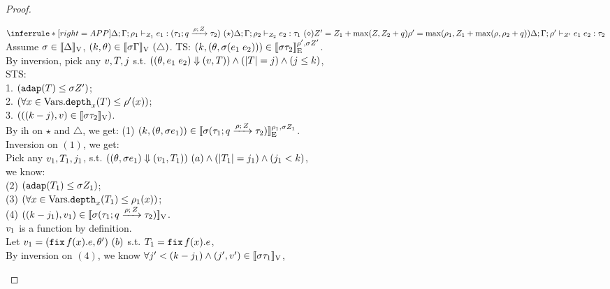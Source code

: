 \documentclass[a4paper,11pt]{article}
\theoremstyle{definition}
\begin{document}
\begin{proof}
\begin{mainitem}
\caseL
{
$
    \inferrule*[right = APP]
    {
      \Delta; \Gamma; \dmap_1 \tvdash{\nnatA_1} \expr_1: (\tarr{\type_1}{\type_2}{\nnatbiA}{\dmap}{\nnatA})~(\star) \\
      \Delta; \Gamma; \dmap_2 \tvdash{\nnatA_2} \expr_2: \type_1 ~(\diamond)\\\\
      \nnatA' = \nnatA_1 + \max(\nnatA, \nnatA_2 + \nnatbiA) \\
      \dmap' = \max(\dmap_1, \nnatA_1 + \max(\dmap, \dmap_2 + \nnatbiA))
    }{
      \Delta; \Gamma; \dmap' \tvdash{\nnatA'} \expr_1 \eapp \expr_2 : \type_2
    }
$
}
%
Assume $ \ienv \in \lrv{\Delta}$, $(\stepiA, \env) \in \lrv{\ienv \Gamma} ~ (\triangle)$. TS: $(\stepiA, (\env, \ienv  (\expr_1 \eapp \expr_2))) \in \lre{\dmap'}{\ienv \nnatA'}{\ienv \type_2}$.\\
%
By inversion, pick any $\valr, \tr, j$
%
s.t. $((\env, \expr_1 \eapp \expr_2) \bigstep (\valr, \tr)) 
\land (\size{\tr} = j) 
\land (j \leq \stepiA) $, \\
%
STS:\\
1. $(\adap(\tr) \leq \ienv \nnatA') $;\\
%
2. $ (\forall x \in \mbox{Vars}. \ddep{x}(\tr) \leq \dmap'(x))$;\\
%
3. $(((\stepiA - j), \valr) \in \lrv{\ienv \type_2})$.\\
%
By ih on $\star$ and $\triangle$, we get: (1) $(\stepiA, (\env, \ienv  \expr_1)) \in \lre{\dmap_1}{\ienv  \nnatA_1}{ \ienv (\tarr{\type_1}{\type_2}{\nnatbiA}{\dmap}{\nnatA}) }$.\\
%
Inversion on $(1)$, we get:\\
%
Pick any $\valr_1, \tr_1, j_1$, s.t. $((\env, \ienv \expr_1) \bigstep (\valr_1, \tr_1)) ~(a) \land (\size{\tr_1} = j_1) \land (j_1 < \stepiA)$, \\
%
we know: \\
(2) $(\adap(\tr_1) \leq \ienv \nnatA_1)$;\\
%
(3) $ (\forall x \in \mbox{Vars}. \ddep{x}(\tr_1) \leq \dmap_1(x))$;\\
%
(4) $((\stepiA - j_1), \valr_1) \in \lrv{ \ienv (\tarr{\type_1}{\type_2}{\nnatbiA}{\dmap}{\nnatA}) }$.\\
%
$\valr_1$ is a function by definition.\\
%
Let $\valr_1 = (\efix f(x). \expr, \env') ~(b)$ s.t. $\tr_1= \efix f(x). \expr$,\\
%
By inversion on $(4)$, we know $\forall j' < (\stepiA - j_1) \land (j', \valr') \in \lrv{\ienv \type_1}$,\\

\end{mainitem}
\end{proof}
\end{document}

